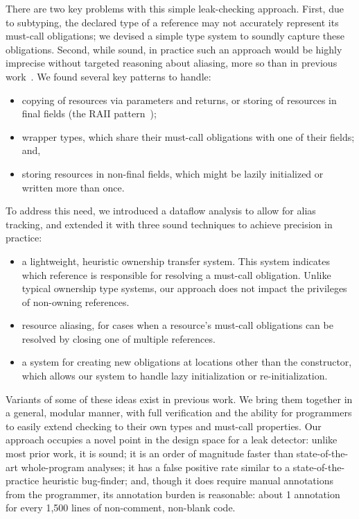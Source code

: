 There are two key problems with this simple leak-checking approach.  First,
due to subtyping, the declared type of a reference may not accurately represent
its must-call obligations; we devised a simple type system to soundly capture
these obligations.  Second, while sound, in practice
such an approach would be highly imprecise without targeted reasoning about
aliasing, more so than in
previous work~\cite{KelloggRSSE2020}.  We found several key patterns to
handle:
\begin{itemize}
\item copying of resources via parameters and returns, or storing of resources in
final fields (the RAII pattern~\cite{raii});
\item wrapper types, which share their must-call obligations with one of their fields; and,
\item storing resources in non-final fields, which might be lazily initialized or
  written more than once.
\end{itemize}
To address this need, we introduced a
dataflow analysis to allow for alias tracking, and extended it with three sound
techniques to achieve precision in practice:
\begin{itemize}
\item a lightweight, heuristic ownership transfer system. This system
  indicates which reference is responsible for resolving a must-call
  obligation. Unlike typical ownership type systems, our approach does
  not impact the privileges of non-owning references.
\item resource aliasing, for cases
  when
  a resource's must-call obligations
  can be resolved by closing one of multiple references.
\item a system for creating new obligations at locations other than the
  constructor, which allows our system to handle lazy initialization or re-initialization.
\end{itemize}
Variants of some of these ideas exist in previous work.  We bring
them together in a general, modular manner, with full verification and
the ability for programmers to easily extend checking to their own
types and must-call properties.
%
Our approach occupies a novel point in the design space for a leak detector:
unlike most prior work, it is sound; it is an order of magnitude faster than
state-of-the-art whole-program analyses; it has a false positive rate similar
to a state-of-the-practice heuristic bug-finder; and, though it does require manual
annotations from the programmer, its annotation burden is reasonable: about
1 annotation for every 1,500 lines of non-comment, non-blank code. 

